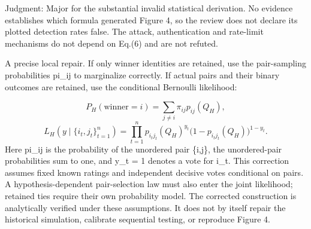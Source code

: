 \documentclass[10pt]{article}
\begin{document}
Judgment: Major for the substantial invalid statistical derivation. No evidence establishes which formula generated Figure 4, so the review does not declare its plotted detection rates false. The attack, authentication and rate-limit mechanisms do not depend on Eq.(6) and are not refuted.\par
A precise local repair. If only winner identities are retained, use the pair-sampling probabilities pi\_ij to marginalize correctly. If actual pairs and their binary outcomes are retained, use the conditional Bernoulli likelihood:\par
\[P_H(\mathrm{winner}=i)=\sum_{j\ne i}\pi_{ij}p_{ij}(Q_H),\] \[L_H(y\mid\{i_t,j_t\}_{t=1}^{n})
=\prod_{t=1}^{n}p_{i_tj_t}(Q_H)^{y_t}
\bigl(1-p_{i_tj_t}(Q_H)\bigr)^{1-y_t}.\] Here pi\_ij is the probability of the unordered pair \{i,j\}, the unordered-pair probabilities sum to one, and y\_t = 1 denotes a vote for i\_t. This correction assumes fixed known ratings and independent decisive votes conditional on pairs. A hypothesis-dependent pair-selection law must also enter the joint likelihood; retained ties require their own probability model. The corrected construction is analytically verified under these assumptions. It does not by itself repair the historical simulation, calibrate sequential testing, or reproduce Figure 4.\par
\end{document}

